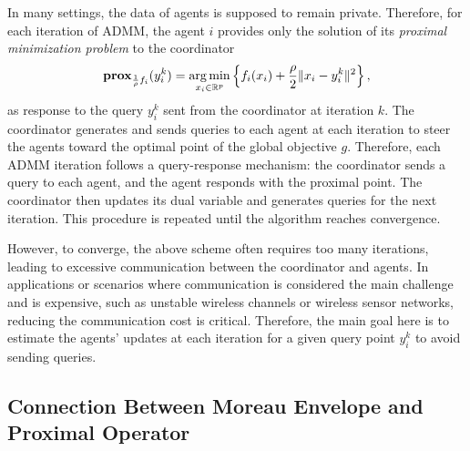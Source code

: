 \documentclass[conference]{IEEEtran}
\newcommand{\AD}[1]{}
\newcommand{\Long}[1]{}
\DeclareMathOperator*{\argmin}{arg\,min}
\begin{document}
In many settings, the data of agents is supposed to remain private. 
Therefore, for each iteration of ADMM, the agent $i$ provides only the solution of its \textit{proximal minimization problem} to the coordinator
\begin{equation}
    \mathbf{prox}_{\frac{1}{\rho}f_i}(y_i^k) = \argmin_{x_i \in \mathbb{R}^p} \left \{ f_i(x_i) + \frac{\rho}{2} \| x_i - y_i^k\|^2\right \}\text,
\end{equation}
as response to the query $y_i^k$ sent from the coordinator at iteration $k$. The coordinator generates and sends queries to each agent at each iteration to steer the agents toward the optimal point of the global objective $g$. 
Therefore, each ADMM iteration follows a query-response mechanism: the coordinator sends a query to each agent, and the agent responds with the proximal point. 
The coordinator then updates its dual variable and generates queries for the next iteration. This procedure is repeated until the algorithm reaches convergence. %

However, to converge, the above scheme often requires too many iterations, leading to excessive communication between the coordinator and agents. In applications or scenarios where communication is considered the main challenge and is expensive, such as unstable wireless channels or wireless sensor networks, reducing the communication cost is critical. 
Therefore, the main goal here is to estimate the agents' updates at each iteration for a given query point $y_i^k$ to avoid sending queries.


\subsection{Connection Between Moreau Envelope and Proximal Operator}
\end{document}
